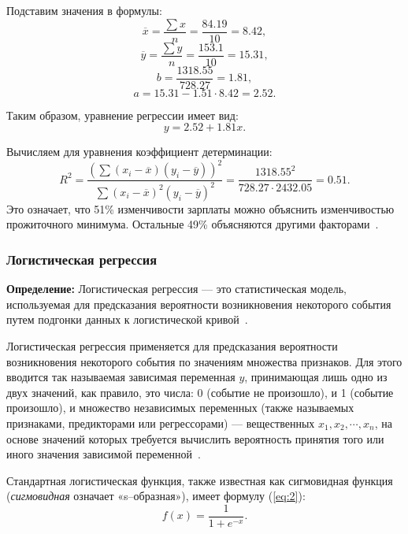 Подставим значения в формулы:
\begin{equation}
    \overline{x} = \frac{\sum x}{n} = \frac{84.19}{10} = 8.42,
\end{equation}
\begin{equation}
    \overline{y} = \frac{\sum y}{n} = \frac{153.1}{10} = 15.31,
\end{equation}
\begin{equation}
    b = \frac{1318.55}{728.27} = 1.81,
\end{equation}
\begin{equation}
    a = 15.31 - 1.51 \cdot 8.42 = 2.52.
\end{equation}

Таким образом, уравнение регрессии имеет вид:
\begin{equation}
    y = 2.52 + 1.81x.
\end{equation}

Вычисляем для уравнения коэффициент детерминации:
\begin{equation}
    R^2 = \frac{(\sum(x_i - \overline{x})(y_i - \overline{y}))^2}{\sum (x_i - \overline{x})^2(y_i - \overline{y})^2} = \frac{1318.55^2}{728.27 \cdot 2432.05} = 0.51.
\end{equation}
Это означает, что 51\% изменчивости зарплаты можно объяснить изменчивостью прожиточного минимума.
Остальные 49\% объясняются другими факторами~\cite{plehanov}.

\subsubsection{Логистическая регрессия}

\textbf{ Определение:} Логистическая регрессия --- это статистическая модель, используемая для предсказания вероятности возникновения некоторого события путем подгонки данных к логистической кривой~\cite{kras}.

Логистическая регрессия применяется для предсказания вероятности возникновения некоторого события по значениям множества признаков.
Для этого вводится так называемая зависимая переменная $y$, принимающая лишь одно из двух значений, как правило, это числа: 0 (событие не произошло), и 1 (событие произошло), и множество независимых переменных (также называемых признаками, предикторами или регрессорами) --- вещественных $x_1, x_2, \cdots, x_n$, на основе значений которых требуется вычислить вероятность принятия того или иного значения зависимой переменной~\cite{kras}.

Стандартная логистическая функция, также известная как сигмовидная функция (\textit{сигмовидная} означает «s--образная»), имеет формулу (\ref{eq:2}):
\begin{equation}
    f(x) = \frac{1}{1 + e^{-x}}.
    \label{eq:2}
\end{equation}


